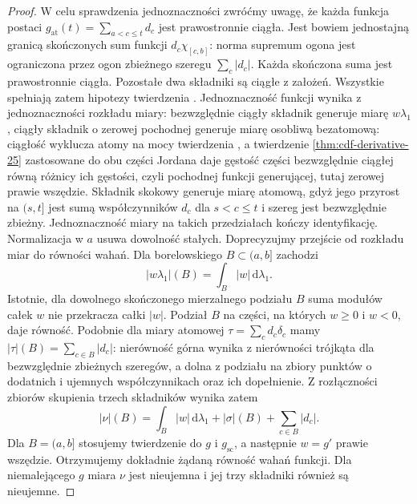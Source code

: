 \begin{proof}
W celu sprawdzenia jednoznaczności zwróćmy uwagę,
że każda funkcja postaci
$g_{\mathrm{at}}(t)=\sum_{a<c\le t}d_c$ jest prawostronnie
ciągła. Jest bowiem jednostajną granicą skończonych sum
funkcji $d_c\chi_{[c,b]}$: norma supremum ogona jest
ograniczona przez ogon zbieżnego szeregu $\sum_c|d_c|$.
Każda skończona suma jest prawostronnie ciągła.
Pozostałe dwa składniki są ciągłe z założeń.
Wszystkie spełniają zatem hipotezy twierdzenia
.
Jednoznaczność funkcji wynika z jednoznaczności rozkładu
miary: bezwzględnie ciągły składnik generuje miarę
$w\lambda_1$, ciągły składnik o zerowej pochodnej
generuje miarę osobliwą bezatomową: ciągłość wyklucza
atomy na mocy twierdzenia ,
a twierdzenie \ref{thm:cdf-derivative-25} zastosowane
do obu części Jordana daje gęstość części bezwzględnie
ciągłej równą różnicy ich gęstości, czyli pochodnej
funkcji generującej, tutaj zerowej prawie wszędzie.
Składnik skokowy generuje miarę atomową, gdyż jego
przyrost na $(s,t]$ jest sumą współczynników
$d_c$ dla $s<c\le t$ i szereg jest bezwzględnie zbieżny.
Jednoznaczność miary na takich przedziałach kończy
identyfikację.
Normalizacja w $a$ usuwa dowolność stałych.
Doprecyzujmy przejście od rozkładu miar do równości
wahań. Dla borelowskiego $B\subset(a,b]$ zachodzi
\[
 |w\lambda_1|(B)=\int_B|w|\,\mathrm d\lambda_1.
\]
Istotnie, dla dowolnego skończonego mierzalnego podziału
$B$ suma modułów całek $w$ nie przekracza całki $|w|$.
Podział $B$ na części, na których $w\ge0$ i $w<0$,
daje równość. Podobnie dla miary atomowej
$\tau=\sum_c d_c\delta_c$ mamy
$|\tau|(B)=\sum_{c\in B}|d_c|$: nierówność górna wynika
z nierówności trójkąta dla bezwzględnie zbieżnych
szeregów, a dolna z podziału na zbiory punktów
o dodatnich i ujemnych współczynnikach oraz ich
dopełnienie. Z rozłączności zbiorów skupienia
trzech składników wynika zatem
\[
 |\nu|(B)=\int_B|w|\,\mathrm d\lambda_1
           +|\sigma|(B)+\sum_{c\in B}|d_c|.
\]
Dla $B=(a,b]$ stosujemy twierdzenie
 do $g$ i $g_{\mathrm{sc}}$,
a następnie $w=g'$ prawie wszędzie. Otrzymujemy
dokładnie żądaną równość wahań funkcji. Dla niemalejącego $g$ miara $\nu$ jest
nieujemna i jej trzy składniki również są nieujemne.
\end{proof}

